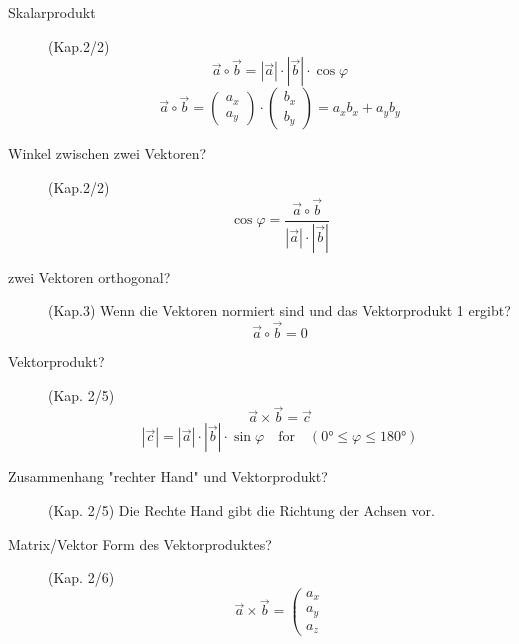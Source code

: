 \begin{description}
	\item[Skalarprodukt] (Kap.2/2) 
						\begin{equation}
							\vec{a} \circ \vec{b} = |\vec{a}| \cdot |\vec{b}| \cdot \cos\varphi 
						\end{equation}
						\begin{equation}
							\vec{a} \circ \vec{b} =
							\left(
								\begin{array}{c}
									a_{x} \\
									a_{y}
								\end{array}
							\right) 
							\cdot 
							\left(
								\begin{array}{c}
									b_{x} \\
									b_{y}
								\end{array}
							\right)
							=
							a_{x}b_{x}
							+
							a_{y}b_{y} 
						\end{equation}
	\item[Winkel zwischen zwei Vektoren?] (Kap.2/2)
		\begin{equation}
			\cos\varphi = \frac{\vec{a} \circ \vec{b}}{|\vec{a}| \cdot |\vec{b}|}
		\end{equation}	
	\item[zwei Vektoren orthogonal?] (Kap.3)
		Wenn die Vektoren normiert sind und das Vektorprodukt 1 ergibt?		
		\begin{equation}
			\vec{a} \circ \vec{b} = 0
		\end{equation}
	\item[Vektorprodukt?] (Kap. 2/5)
		\begin{equation}
			\vec{a} \times \vec{b} = \vec{c}
		\end{equation}
		\begin{equation}
			|\vec{c}| = |\vec{a}| \cdot |\vec{b}| \cdot \sin\varphi 
			\quad \textrm{for} \quad 
			(\ang{0} \leq \varphi \leq \ang{180})
		\end{equation}
	\item[Zusammenhang "rechter Hand" und Vektorprodukt?] (Kap. 2/5)
		Die Rechte Hand gibt die Richtung der Achsen vor. 
	\item[Matrix/Vektor Form des Vektorproduktes?] (Kap. 2/6)
		\begin{equation}
			\vec{a} \times \vec{b} = 
				\left(
					\begin{array}{c}
						a_{x} \\
						a_{y} \\
						a_{z}
					\end{array}

\end{equation}
\end{description}
